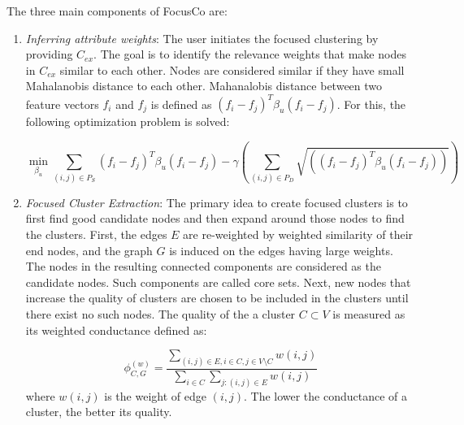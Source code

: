 \documentclass[11pt, oneside]{article}   	%
\begin{document}
\quad The three main components of FocusCo \cite{focusco} are:
\begin{enumerate}
\item \emph{Inferring attribute weights}: 
The user initiates the focused clustering by providing $C_{ex}$.
The goal is to identify the relevance weights that make nodes in $C_{ex}$ similar to each other. Nodes are considered similar if they have small Mahalanobis distance to each other.
Mahanalobis distance between two feature vectors $f_i$ and $f_j$ is defined as $(f_i - f_j)^T\beta_u(f_i-f_j)$. For this, the following optimization problem is solved:

\begin{equation*}
\min_{\beta_u} \sum_{(i,j) \in P_S}(f_i - f_j)^T\beta_u(f_i-f_j) - \gamma \left( \sum_{(i,j) \in P_D} \sqrt{((f_i - f_j)^T\beta_u(f_i-f_j))} \right)
\end{equation*}  

\item \emph{Focused Cluster Extraction}: 
The primary idea to create focused clusters is to first find good candidate nodes and then expand around those nodes to find the clusters.
First, the edges $E$ are re-weighted by weighted similarity of their end nodes, and the graph $G$ is induced on the edges having large weights.
The nodes in the resulting connected components are considered as the candidate nodes. Such components are called core sets.
Next, new nodes that increase the quality of clusters are chosen to be included in the clusters until there exist no such nodes.
The quality of the a cluster $C \subset V$ is measured as its weighted conductance defined as:

\begin{equation*}
\phi^{(w)}_{C, G} = \frac {\sum\limits_{(i,j)\in E, i\in C, j\in V\setminus C}w(i,j)} 
														  {\sum\limits_{i\in C} \sum\limits_{j:(i,j)\in E}w(i,j)} %
\end{equation*}
where $w(i,j)$ is the weight of edge $(i, j)$.
The lower the conductance of a cluster, the better its quality.

\end{enumerate}
\end{document}
